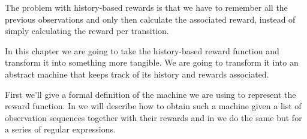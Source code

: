 The problem with history-based rewards is that we have to remember all the previous observations and only then calculate the associated reward, instead of simply calculating the reward per transition. 

In this chapter we are going to take the history-based reward function and transform it into something more tangible. We are going to transform it into an abstract machine that keeps track of its history and rewards associated. 

First we'll give a formal definition of the machine we are using to represent the reward function. In  we will describe how to obtain such a machine given a list of observation sequences together with their rewards and in  we do the same but for a series of regular expressions. 







